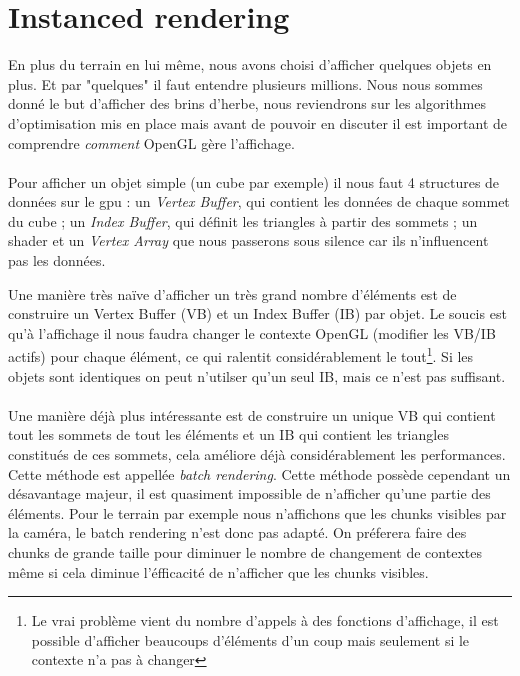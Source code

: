 \documentclass{EPUProjetDi}
\begin{document}
\section{Instanced rendering}
\label{sec:instanced_rendering}

En plus du terrain en lui même, nous avons choisi d'afficher quelques objets en plus. Et par "quelques" il faut entendre plusieurs millions. Nous nous sommes donné le but d'afficher des brins d'herbe, nous reviendrons sur les algorithmes d'optimisation mis en place mais avant de pouvoir en discuter il est important de comprendre \textit{comment} OpenGL gère l'affichage.
\paragraph{}
Pour afficher un objet simple (un cube par exemple) il nous faut 4 structures de données sur le gpu : un \textit{Vertex Buffer}, qui contient les données de chaque sommet du cube ; un \textit{Index Buffer}, qui définit les triangles à partir des sommets ; un shader et un \textit{Vertex Array} que nous passerons sous silence car ils n'influencent pas les données.

Une manière très naïve d'afficher un très grand nombre d'éléments est de construire un Vertex Buffer (VB) et un Index Buffer (IB) par objet. Le soucis est qu'à l'affichage il nous faudra changer le contexte OpenGL (modifier les VB/IB actifs) pour chaque élément, ce qui ralentit considérablement le tout\footnote{Le vrai problème vient du nombre d'appels à des fonctions d'affichage, il est possible d'afficher beaucoups d'éléments d'un coup mais seulement si le contexte n'a pas à changer}.
Si les objets sont identiques on peut n'utilser qu'un seul IB, mais ce n'est pas suffisant.

\paragraph{}
Une manière déjà plus intéressante est de construire un unique VB qui contient tout les sommets de tout les éléments et un IB qui contient les triangles constitués de ces sommets, cela améliore déjà considérablement les performances. Cette méthode est appellée \textit{batch rendering}.
Cette méthode possède cependant un désavantage majeur, il est quasiment impossible de n'afficher qu'une partie des éléments. Pour le terrain par exemple nous n'affichons que les chunks visibles par la caméra, le batch rendering n'est donc pas adapté. On préferera faire des chunks de grande taille pour diminuer le nombre de changement de contextes même si cela diminue l'éfficacité de n'afficher que les chunks visibles.
\end{document}
